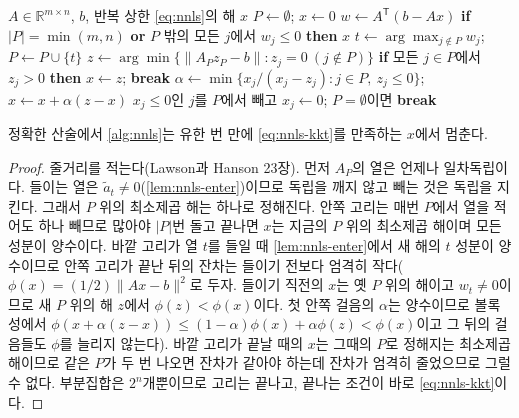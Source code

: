 \begin{algorithm}[htbp]
\begin{algorithmic}[1]
\Require $A\in\mathbb R^{m\times n}$, $b$, 반복 상한
\Ensure \cref{eq:nnls}의 해 $x$
\State $P\gets\emptyset$; $x\gets0$
\Loop
  \State $w\gets A^{\mathsf T}(b-Ax)$ 
  \State \textbf{if} $|P|=\min(m,n)$ \textbf{or} $P$ 밖의 모든 $j$에서 $w_j\le0$ \textbf{then} \Return $x$ 
  \State $t\gets\arg\max_{j\notin P}w_j$; $P\gets P\cup\{t\}$ 
  \Loop
    \State $z\gets\arg\min\{\|A_Pz_P-b\|:z_j=0\ (j\notin P)\}$ 
    \State \textbf{if} 모든 $j\in P$에서 $z_j>0$ \textbf{then} $x\gets z$; \textbf{break}
    \State $\alpha\gets\min\{x_j/(x_j-z_j):j\in P,\ z_j\le0\}$; $x\gets x+\alpha(z-x)$
    \State $x_j\le0$인 $j$를 $P$에서 빼고 $x_j\gets0$; $P=\emptyset$이면 \textbf{break}
  \EndLoop
\EndLoop
\end{algorithmic}
\caption{Lawson--Hanson의 비음 최소제곱 (stardust 의 )}
\label{alg:nnls}
\end{algorithm}

\begin{theorem}
\label{thm:nnls-finite}
정확한 산술에서 \cref{alg:nnls}는 유한 번 만에 \cref{eq:nnls-kkt}를 만족하는 $x$에서 멈춘다.
\end{theorem}

\begin{proof}
줄거리를 적는다(Lawson과 Hanson\cite{lawson1995} 23장). 먼저 $A_P$의 열은 언제나 일차독립이다. 들이는 열은 $\tilde a_t\ne0$(\cref{lem:nnls-enter})이므로 독립을 깨지 않고 빼는 것은 독립을 지킨다. 그래서 $P$ 위의 최소제곱 해는 하나로 정해진다. 안쪽 고리는 매번 $P$에서 열을 적어도 하나 빼므로 많아야 $|P|$번 돌고 끝나면 $x$는 지금의 $P$ 위의 최소제곱 해이며 모든 성분이 양수이다. 바깥 고리가 열 $t$를 들일 때 \cref{lem:nnls-enter}에서 새 해의 $t$ 성분이 양수이므로 안쪽 고리가 끝난 뒤의 잔차는 들이기 전보다 엄격히 작다($\phi(x)=(1/2)\|Ax-b\|^2$로 두자. 들이기 직전의 $x$는 옛 $P$ 위의 해이고 $w_t\ne0$이므로 새 $P$ 위의 해 $z$에서 $\phi(z)<\phi(x)$이다. 첫 안쪽 걸음의 $\alpha$는 양수이므로 볼록성에서 $\phi(x+\alpha(z-x))\le(1-\alpha)\phi(x)+\alpha\phi(z)<\phi(x)$이고 그 뒤의 걸음들도 $\phi$를 늘리지 않는다). 바깥 고리가 끝날 때의 $x$는 그때의 $P$로 정해지는 최소제곱 해이므로 같은 $P$가 두 번 나오면 잔차가 같아야 하는데 잔차가 엄격히 줄었으므로 그럴 수 없다. 부분집합은 $2^n$개뿐이므로 고리는 끝나고, 끝나는 조건이 바로 \cref{eq:nnls-kkt}이다.
\end{proof}

